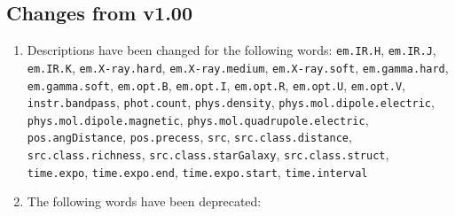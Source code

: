 \documentclass[11pt,a4paper]{ivoa}
\begin{document}
\subsection{Changes from v1.00}
\begin{enumerate}
\item \begin{flushleft}
Descriptions have been changed for the following words: 
{\tt em.IR.H}, {\tt em.IR.J}, 
{\tt em.IR.K}, {\tt em.X-ray.hard}, {\tt em.X-ray.medium}, {\tt em.X-ray.soft}, {\tt em.gamma.hard}, 
{\tt em.gamma.soft}, {\tt em.opt.B}, {\tt em.opt.I}, {\tt em.opt.R}, {\tt em.opt.U}, {\tt em.opt.V}, 
{\tt instr.bandpass}, {\tt phot.count}, {\tt phys.density}, {\tt phys.mol.dipole.electric}, 
{\tt phys.mol.dipole.magnetic}, {\tt phys.mol.quadrupole.electric}, {\tt pos.angDistance}, 
{\tt pos.precess}, {\tt src}, {\tt src.class.distance}, {\tt src.class.richness}, 
{\tt src.class.starGalaxy}, {\tt src.class.struct}, {\tt time.expo}, {\tt time.expo.end}, 
{\tt time.expo.start}, {\tt time.interval}
\end{flushleft}
\item The following words have been deprecated: 


\end{enumerate}
\end{document}
